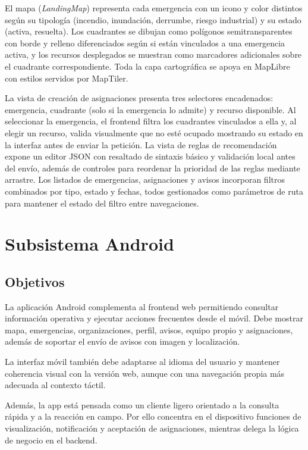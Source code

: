 El mapa (\textit{LandingMap}) representa cada emergencia con un icono y color distintos según su tipología (incendio, inundación, derrumbe, riesgo industrial) y su estado (activa, resuelta). Los cuadrantes se dibujan como polígonos semitransparentes con borde y relleno diferenciados según si están vinculados a una emergencia activa, y los recursos desplegados se muestran como marcadores adicionales sobre el cuadrante correspondiente. Toda la capa cartográfica se apoya en MapLibre con estilos servidos por MapTiler.

La vista de creación de asignaciones presenta tres selectores encadenados: emergencia, cuadrante (solo si la emergencia lo admite) y recurso disponible. Al seleccionar la emergencia, el frontend filtra los cuadrantes vinculados a ella y, al elegir un recurso, valida visualmente que no esté ocupado mostrando su estado en la interfaz antes de enviar la petición. La vista de reglas de recomendación expone un editor JSON con resaltado de sintaxis básico y validación local antes del envío, además de controles para reordenar la prioridad de las reglas mediante arrastre. Los listados de emergencias, asignaciones y avisos incorporan filtros combinados por tipo, estado y fechas, todos gestionados como parámetros de ruta para mantener el estado del filtro entre navegaciones.

\section{Subsistema Android}

\subsection{Objetivos}

La aplicación Android complementa al frontend web permitiendo consultar información operativa y ejecutar acciones frecuentes desde el móvil. Debe mostrar mapa, emergencias, organizaciones, perfil, avisos, equipo propio y asignaciones, además de soportar el envío de avisos con imagen y localización.

La interfaz móvil también debe adaptarse al idioma del usuario y mantener coherencia visual con la versión web, aunque con una navegación propia más adecuada al contexto táctil.

Además, la app está pensada como un cliente ligero orientado a la consulta rápida y a la reacción en campo. Por ello concentra en el dispositivo funciones de visualización, notificación y aceptación de asignaciones, mientras delega la lógica de negocio en el backend.

